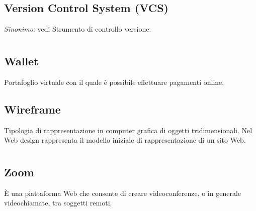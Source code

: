 	\subsection*{Version Control System (VCS)}
	\textit{Sinonimo}: vedi Strumento di controllo versione.
\pagebreak
\section[W]{}
	\subsection*{Wallet}
	Portafoglio virtuale con il quale è possibile effettuare pagamenti online.
	\subsection*{Wireframe}
	Tipologia di rappresentazione in computer grafica di oggetti tridimensionali. Nel Web design rappresenta il modello iniziale di rappresentazione di un sito Web.
\pagebreak
\section[Z]{}
	\subsection*{Zoom}
	È una piattaforma Web che consente di creare videoconferenze, o in generale videochiamate, tra soggetti remoti.
